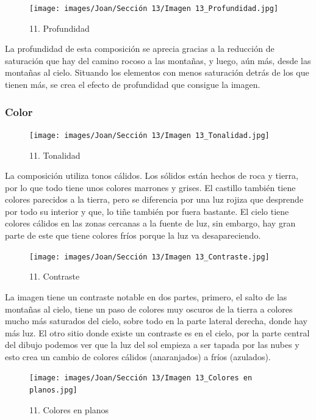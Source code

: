 \documentclass[12pt]{article}
\begin{document}
    \begin{figure}[H]
          \centering
          \texttt{[image: images/Joan/Sección 13/Imagen 13\_Profundidad.jpg]}
          \caption{\small 11. Profundidad}
        \end{figure}

        La profundidad de esta composición se aprecia gracias a la reducción de saturación que hay del camino rocoso a las montañas, y luego, aún más, desde las montañas al cielo. 
    Situando los elementos con menos saturación detrás de los que tienen más, se crea el efecto de profundidad que consigue la imagen. 

            \subsubsection{Color}
    \begin{figure}[H]
          \centering
          \texttt{[image: images/Joan/Sección 13/Imagen 13\_Tonalidad.jpg]}
          \caption{\small 11. Tonalidad}
        \end{figure}

            La composición utiliza tonos cálidos. Los sólidos están hechos de roca y tierra, por lo que todo tiene unos colores marrones y grises. El castillo también tiene colores parecidos a la tierra, pero se diferencia por una luz rojiza que desprende por todo su interior y que, lo tiñe también por fuera bastante. 
    El cielo tiene colores cálidos en las zonas cercanas a la fuente de luz, sin embargo, hay gran parte de este que tiene colores fríos porque la luz va desapareciendo. 

            \begin{figure}[H]
          \centering
          \texttt{[image: images/Joan/Sección 13/Imagen 13\_Contraste.jpg]}
          \caption{\small 11. Contraste}
        \end{figure}
        La imagen tiene un contraste notable en dos partes, primero, el salto de las montañas al cielo, tiene un paso de colores muy oscuros de la tierra a colores mucho más saturados del cielo, sobre todo en la parte lateral derecha, donde hay más luz. 
    El otro sitio donde existe un contraste es en el cielo, por la parte central del dibujo podemos ver que la luz del sol empieza a ser tapada por las nubes y esto crea un cambio de colores cálidos (anaranjados) a fríos (azulados). 

        \begin{figure}[H]
          \centering
          \texttt{[image: images/Joan/Sección 13/Imagen 13\_Colores en planos.jpg]}
          \caption{\small 11. Colores en planos}
        \end{figure}
\end{document}
